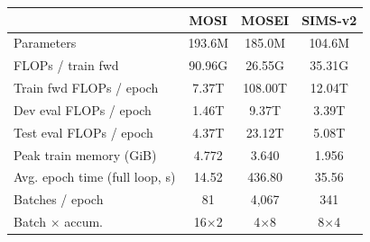 \begin{tabular}{l|ccc}
\toprule
& MOSI & MOSEI & SIMS-v2 \\
\midrule
Parameters & 193.6M & 185.0M & 104.6M \\
FLOPs / train fwd & 90.96G & 26.55G & 35.31G \\
Train fwd FLOPs / epoch & 7.37T & 108.00T & 12.04T \\
Dev eval FLOPs / epoch & 1.46T & 9.37T & 3.39T \\
Test eval FLOPs / epoch & 4.37T & 23.12T & 5.08T \\
Peak train memory (GiB) & 4.772 & 3.640 & 1.956 \\
Avg. epoch time (full loop, s) & 14.52 & 436.80 & 35.56 \\
Batches / epoch & 81 & 4{,}067 & 341 \\
Batch $\times$ accum. & 16$\times$2 & 4$\times$8 & 8$\times$4 \\
\bottomrule
\end{tabular}
